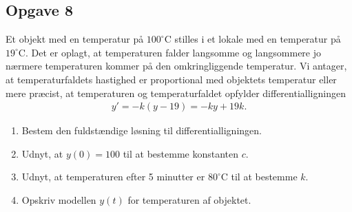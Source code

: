 \newpage

\subsection*{Opgave 8}
	Et objekt med en temperatur på $100^\circ$C stilles i et lokale med en temperatur på $19^\circ$C. Det er oplagt, at temperaturen falder langsomme og langsommere jo nærmere
	temperaturen kommer på den omkringliggende temperatur. Vi antager, at temperaturfaldets hastighed er proportional med objektets temperatur eller mere præcist, at 
	temperaturen og temperaturfaldet opfylder differentialligningen
	\begin{align*}
		y' = -k(y-19) = -ky+19k.
	\end{align*}
	\begin{enumerate}[label=\roman*)]
		\item Bestem den fuldstændige løsning til differentialligningen. 
		\item Udnyt, at $y(0) = 100$ til at bestemme konstanten $c$. 
		\item Udnyt, at temperaturen efter 5 minutter er $80^\circ$C til at bestemme $k$. 
		\item Opskriv modellen $y(t)$ for temperaturen af objektet. 
	\end{enumerate}
